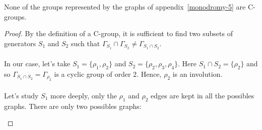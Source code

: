 \begin{theorem}
  None of the groups represented by the graphs of appendix~\ref{monodromy-5} are C-groups.
\end{theorem}

\begin{proof}
  By the definition of a C-group, it is sufficient to find two subsets of generators $S_1$ and $S_2$ such that $\Gamma_{S_1} \cap \Gamma_{S_2} \neq \Gamma_{S_1 \cap S_2}$.

  \paragraph{}
  In our case, let's take $S_1 = \{\rho_1, \rho_2\}$ and $S_2 = \{\rho_2, \rho_3, \rho_4\}$. Here $S_1 \cap S_2 = \{\rho_2\}$ and so $\Gamma_{S_1 \cap S_2} = \Gamma_{\rho_2}$ is a cyclic group of order 2. Hence, $\rho_2$ is an involution.

  \paragraph{}
  Let's study $S_1$ more deeply, only the $\rho_1$ and $\rho_2$ edges are kept in all the possibles graphs. There are only two possibles graphs:

  \begin{figure}[H]
    \begin{center}
\end{center}
\end{figure}
\end{proof}
